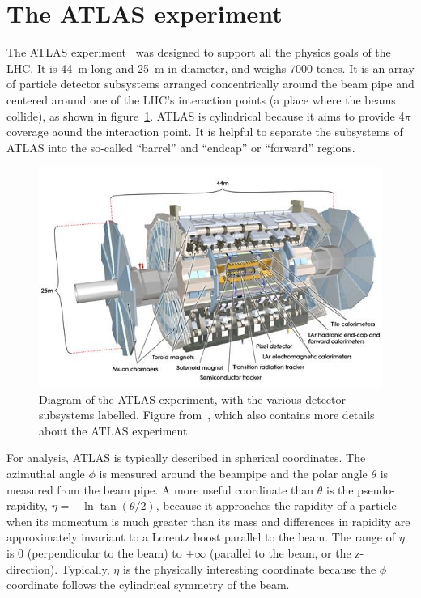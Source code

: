 \section{The ATLAS experiment}
\label{sec:atlas}

The ATLAS experiment~\cite{collaboration_atlas_2008} was designed to support all the physics goals of the LHC. It is \SI{44}{\meter} long and \SI{25}{\meter} in diameter, and weighs 7000 tones. It is an array of particle detector subsystems arranged concentrically around the beam pipe and centered around one of the LHC's interaction points (a place where the beams collide), as shown in figure~\ref{fig:atlas}. ATLAS is cylindrical because it aims to provide 4$\pi$ coverage aound the interaction point. It is helpful to separate the subsystems of ATLAS into the so-called ``barrel'' and ``endcap'' or ``forward'' regions.  %

\begin{figure}
    \centering
    \includegraphics[width = \textwidth]{figures/atlas_diagram.png}
    \caption{Diagram of the ATLAS experiment, with the various detector subsystems labelled. Figure from~\cite{collaboration_atlas_2008}, which also contains more details about the ATLAS experiment.}
    \label{fig:atlas}
\end{figure}

For analysis, ATLAS is typically described in spherical coordinates. The azimuthal angle $\phi$ is measured around the beampipe and the polar angle $\theta$ is measured from the beam pipe. A more useful coordinate than $\theta$ is the pseudo-rapidity, $\eta = -\ln\tan\left(\theta/2\right)$, because it approaches the rapidity of a particle when its momentum is much greater than its mass and differences in rapidity are approximately invariant to a Lorentz boost parallel to the beam. The range of $\eta$ is 0 (perpendicular to the beam) to $\pm\infty$ (parallel to the beam, or the z-direction). Typically, $\eta$ is the physically interesting coordinate because the $\phi$ coordinate follows the cylindrical symmetry of the beam.

